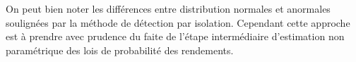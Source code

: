 On peut bien noter les différences entre distribution normales et anormales soulignées par la méthode de détection par isolation. Cependant cette approche est à prendre avec prudence du faite de l'étape intermédiaire d'estimation non paramétrique des lois de probabilité des rendements.



